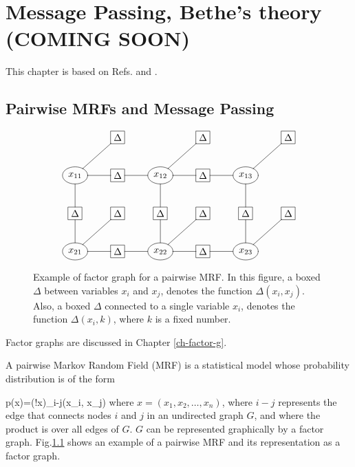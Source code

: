 \chapter{Message Passing, Bethe's theory
(COMING SOON)}
\label{ch-mpass-bethe}

\newcommand{\ttheta}[0]{\TIL{\theta}}
\newcommand{\tP}[0]{\TIL{p}}

This chapter is based
on Refs. \cite{WainJordan}
and \cite{yedidia}.

\section{Pairwise MRFs and Message Passing}





\begin{figure}[h!]
$$\xymatrix{
&*+[F]{\Delta}
&
&*+[F]{\Delta}
&
&*+[F]{\Delta}
\\
*++[o][F]{x_{11}}
\ar@{-}[d]\ar@{-}[r]\ar@{-}[ru]
&*+[F]{\Delta}\ar@{-}[r]
&*++[o][F]{x_{12}}\ar@{-}[d]\ar@{-}[r]
\ar@{-}[ru]
&*+[F]{\Delta}\ar@{-}[r]
&*++[o][F]{x_{13}}\ar@{-}[d]
\ar@{-}[ru]
\\
*+[F]{\Delta}\ar@{-}[d]
&*+[F]{\Delta}
&*+[F]{\Delta}\ar@{-}[d]
&*+[F]{\Delta}
&*+[F]{\Delta}\ar@{-}[d]
&*+[F]{\Delta}
\\
*++[o][F]{x_{21}}\ar@{-}[r]\ar@{-}[ru]
&*+[F]{\Delta}\ar@{-}[r]
&*++[o][F]{x_{22}}\ar@{-}[r]\ar@{-}[ru]
&*+[F]{\Delta}\ar@{-}[r]
&*++[o][F]{x_{23}}\ar@{-}[ru]
}$$
\caption{Example
of factor graph
for a pairwise MRF.
In this figure,
a boxed $\Delta$
between variables $x_i$
and $x_j$,
denotes the function
$\Delta(x_i, x_j)$.
Also, a boxed
$\Delta$
connected to a
single variable $x_i$,
denotes the function
$\Delta(x_i, k)$,
where $k$
is a fixed number.
}
\label{fig-paiwise-mrf}
\end{figure}

Factor graphs
are discussed in Chapter \ref{ch-factor-g}.

A pairwise
Markov Random Field (MRF)
is a statistical model 
whose probability
distribution
is of the form

\beq
p(x)=\caln(!x)\prod_{i-j}\Delta(x_i, x_j)
\label{eq-pairwise-fg}
\eeq
where $x=(x_1, x_2,
\ldots, x_n )$,
where $i-j$
represents the edge
that connects
nodes $i$ and $j$
in an undirected graph $G$,
and where  the product 
is over all edges of $G$.
$G$ can be represented
graphically
by a factor graph.
Fig.\ref{fig-paiwise-mrf}
shows an example
of a pairwise
MRF
and its
representation as a
factor graph.

